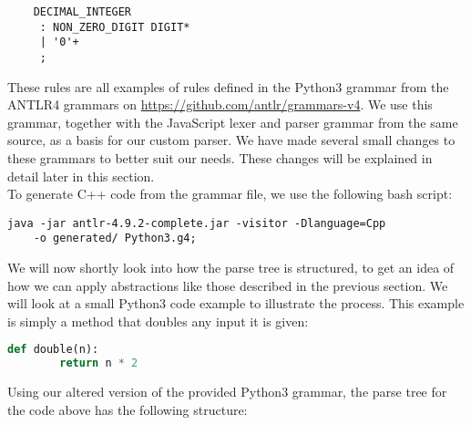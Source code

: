 \documentclass[../Main.tex]{subfiles}
\begin{document}
\begin{lstlisting}
    DECIMAL_INTEGER
     : NON_ZERO_DIGIT DIGIT*
     | '0'+
     ;
\end{lstlisting}\vspace{15pt}

These rules are all examples of rules defined in the Python3 grammar from the ANTLR4 grammars on \href{https://github.com/antlr/grammars-v4}{https://github.com/antlr/grammars-v4}. We use this grammar, together with the JavaScript lexer and parser grammar from the same source, as a basis for our custom parser. We have made several small changes to these grammars to better suit our needs. These changes will be explained in detail later in this section.\\

To generate C++ code from the grammar file, we use the following bash script:
\begin{lstlisting}
java -jar antlr-4.9.2-complete.jar -visitor -Dlanguage=Cpp 
    -o generated/ Python3.g4;
\end{lstlisting}
We will now shortly look into how the parse tree is structured, to get an idea of how we can apply abstractions like those described in the previous section. We will look at a small Python3 code example to illustrate the process. This example is simply a method that doubles any input it is given:\\

\begin{lstlisting}[language=Python]
    def double(n):
        return n * 2
\end{lstlisting}
\vspace{15pt}
Using our altered version of the provided Python3 grammar, the parse tree for the code above has the following structure:\\
\end{document}
